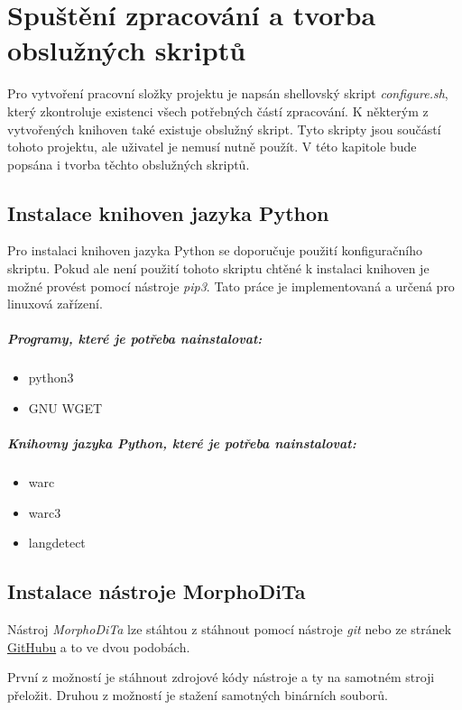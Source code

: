 \chapter{Spuštění zpracování a tvorba obslužných skriptů}
Pro vytvoření pracovní složky projektu je napsán shellovský skript \textit{configure.sh},
který zkontroluje existenci všech potřebných částí zpracování. K některým z vytvořených knihoven
také existuje obslužný skript. Tyto skripty jsou součástí tohoto projektu, ale uživatel je
nemusí nutně použít. V této kapitole bude popsána i tvorba těchto obslužných skriptů.

\section{Instalace knihoven jazyka Python}
Pro instalaci knihoven jazyka Python se doporučuje použití konfiguračního skriptu. Pokud
ale není použití tohoto skriptu chtěné k instalaci knihoven je možné provést pomocí nástroje
\textit{pip3}. Tato práce je implementovaná a určená pro linuxová zařízení.

\paragraph{Programy, které je potřeba nainstalovat:}
\begin{itemize}
    \item python3
    \item GNU WGET
\end{itemize}

\paragraph{Knihovny jazyka Python, které je potřeba nainstalovat:}
\begin{itemize}
    \item warc
    \item warc3
    \item langdetect
\end{itemize}

\section{Instalace nástroje MorphoDiTa}
Nástroj \textit{MorphoDiTa} lze stáhtou z stáhnout pomocí nástroje \textit{git} nebo
ze stránek \href{https://github.com/ufal/morphodita}{GitHubu} a to ve dvou podobách.

První z možností je stáhnout zdrojové kódy nástroje a ty na samotném stroji přeložit.
Druhou z možností je stažení samotných binárních souborů.

